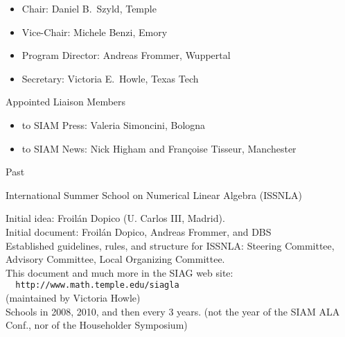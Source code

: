 \documentclass[]{seminar}
\begin{document}
{\begin{slide}
\begin{itemize}
\item {\color{blue} Chair:} Daniel B.\ Szyld, Temple 
\item {\color{blue} Vice-Chair:} Michele Benzi, Emory 
\item {\color{blue} Program Director:} Andreas Frommer, Wuppertal
\item {\color{blue} Secretary:} Victoria E.\ Howle, Texas Tech
\end{itemize}

\vspace*{2mm} 
\begin{center}
{\color{blue}
Appointed Liaison Members
}
\end{center}
\begin{itemize}
\item {\color{blue} to SIAM Press:} Valeria Simoncini, Bologna
\item {\color{blue} to SIAM News:} Nick Higham and Fran\c{c}oise 
Tisseur, Manchester
\end{itemize}


\end{slide}
\begin{slide}

\begin{center}
{\color{red}
Past
}
\end{center}


{\color{blue}
International Summer School on Numerical Linear Algebra (ISSNLA) }

Initial idea: Froil\'an Dopico (U. Carlos III, Madrid). \\

Initial document: Froil\'an Dopico, Andreas Frommer, and DBS
\\
Established guidelines, rules, and
structure for ISSNLA: Steering Committee,
Advisory Committee, Local Organizing Committee.
\\
This document and much more in the SIAG web site:
\\
{\verb#  http://www.math.temple.edu/siagla #} \\
(maintained by Victoria Howle)
\\

Schools in 2008, 2010, and then every 3 years.
(not the year of the SIAM ALA Conf., nor of the Householder Symposium)

\end{slide}
\begin{slide}


\end{slide}}
\end{document}
